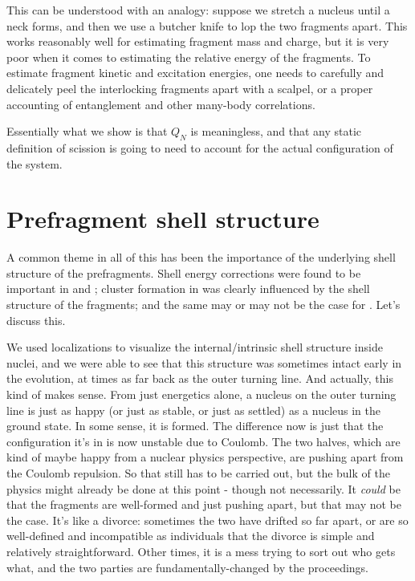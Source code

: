 This can be understood with an analogy: suppose we stretch a nucleus until a neck forms, and then we use a butcher knife to lop the two fragments apart. This works reasonably well for estimating fragment mass and charge, but it is very poor when it comes to estimating the relative energy of the fragments. To estimate fragment kinetic and excitation energies, one needs to carefully and delicately peel the interlocking fragments apart with a scalpel, or a proper accounting of entanglement and other many-body correlations.

Essentially what we show is that $Q_N$ is meaningless, and that any static definition of scission is going to need to account for the actual configuration of the system.

\section{Prefragment shell structure}
A common theme in all of this has been the importance of the underlying shell structure of the prefragments. Shell energy corrections were found to be important in {\Pt} and {\Hg}; cluster formation in {\Og} was clearly influenced by the shell structure of the fragments; and the same may or may not be the case for {\Cf}. Let's discuss this.

We used localizations to visualize the internal/intrinsic shell structure inside nuclei, and we were able to see that this structure was sometimes intact early in the evolution, at times as far back as the outer turning line. And actually, this kind of makes sense. From just energetics alone, a nucleus on the outer turning line is just as happy (or just as stable, or just as settled) as a nucleus in the ground state. In some sense, it is formed. The difference now is just that the configuration it's in is now unstable due to Coulomb. The two halves, which are kind of maybe happy from a nuclear physics perspective, are pushing apart from the Coulomb repulsion. So that still has to be carried out, but the bulk of the physics might already be done at this point - though not necessarily. It \textit{could} be that the fragments are well-formed and just pushing apart, but that may not be the case. It's like a divorce: sometimes the two have drifted so far apart, or are so well-defined and incompatible as individuals that the divorce is simple and relatively straightforward. Other times, it is a mess trying to sort out who gets what, and the two parties are fundamentally-changed by the proceedings.

